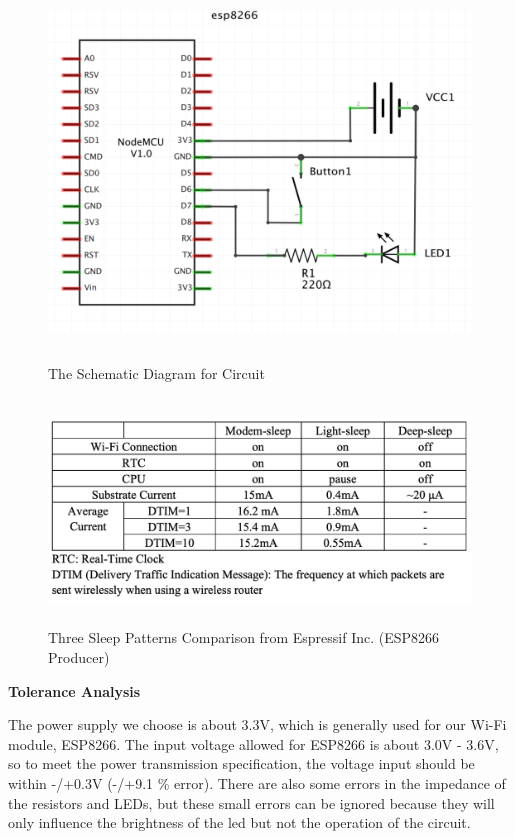 \begin{figure}[h]
   \centering
   \includegraphics[width=13cm,height=10cm]{graph/The Schematic Diagram.png}
   \caption{The Schematic Diagram for Circuit}
   \label{circuit}
   \end{figure}
\begin{figure}[h]
   \centering
   \includegraphics[width=13cm,height=6cm]{graph/esp8266 table.png}
   \caption{Three Sleep Patterns Comparison from Espressif Inc. (ESP8266 Producer)}
   \label{esp8266}
   \end{figure}

\textbf{Tolerance Analysis}   

  The power supply we choose is about 3.3V, which is generally used for our Wi-Fi module, ESP8266. The input voltage allowed for ESP8266 is about 3.0V - 3.6V, so to meet the power transmission specification, the voltage input should be within -/+0.3V (-/+9.1 \% error). There are also some errors in the impedance of the resistors and LEDs, but these small errors can be ignored because they will only influence the brightness of the led but not the operation of the circuit.
\clearpage
